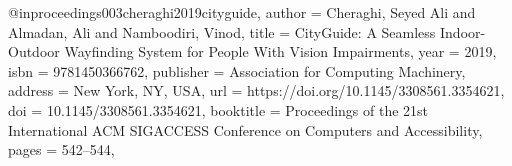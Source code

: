 @inproceedings{003cheraghi2019cityguide,
author = {Cheraghi, Seyed Ali and Almadan, Ali and Namboodiri, Vinod},
title = {CityGuide: A Seamless Indoor-Outdoor Wayfinding System for People With Vision Impairments},
year = {2019},
isbn = {9781450366762},
publisher = {Association for Computing Machinery},
address = {New York, NY, USA},
url = {https://doi.org/10.1145/3308561.3354621},
doi = {10.1145/3308561.3354621},
booktitle = {Proceedings of the 21st International ACM SIGACCESS Conference on Computers and Accessibility},
pages = {542–544},
}